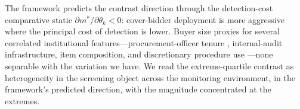 The framework predicts the contrast direction through the
detection-cost comparative static $\partial m^*/\partial
\theta_k < 0$: cover-bidder deployment is more aggressive where
the principal cost of detection is lower. Buyer size proxies for
several correlated institutional features---procurement-officer
tenure \citep{coviello2017tenure}, internal-audit infrastructure,
item composition, and discretionary procedure use
\citep{decarolis2020rules,decarolis2020bureaucratic}---none
separable with the variation we have. We read the
extreme-quartile contrast as heterogeneity in the screening object
across the monitoring environment, in the framework's predicted
direction, with the magnitude concentrated at the extremes.
